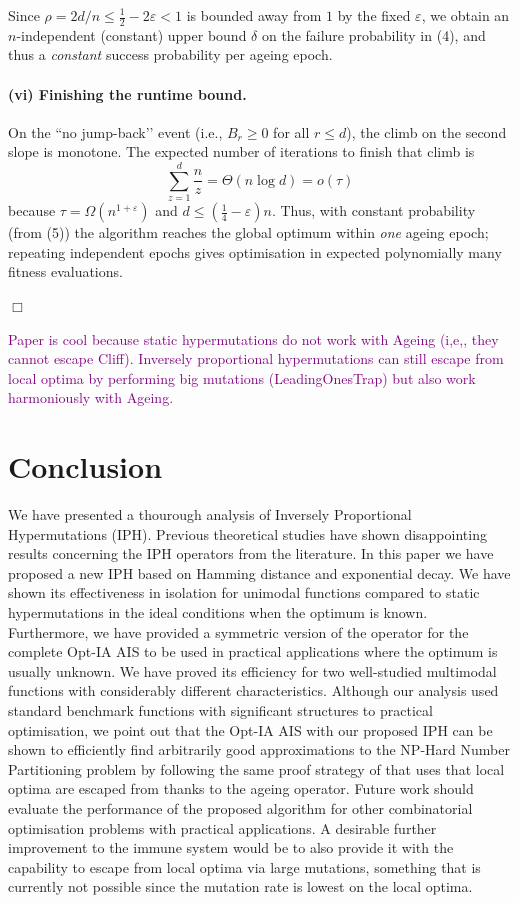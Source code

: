 \documentclass[lettersize,journal]{IEEEtran}
\begin{document}
Since \(\rho=2d/n\le \tfrac12-2\varepsilon<1\) is bounded away from \(1\) by the fixed \(\varepsilon\), we obtain an \(n\)-independent (constant) upper bound \(\delta\) on the failure probability in (4), and thus a \emph{constant} success probability per ageing epoch.

\paragraph{(vi) Finishing the runtime bound.}
On the “no jump-back’’ event (i.e., \(B_r\ge 0\) for all \(r\le d\)), the climb on the second slope is monotone. The expected number of iterations to finish that climb is
\[
\sum_{z=1}^{d}\frac{n}{z}=\Theta(n\log d)=o(\tau)
\]
because \(\tau=\Omega(n^{1+\varepsilon})\) and \(d\le (\tfrac14-\varepsilon)n\).
Thus, with constant probability (from (5)) the algorithm reaches the global optimum within \emph{one} ageing epoch; repeating independent epochs gives optimisation in expected polynomially many fitness evaluations.

\hfill\(\Box\)


\textcolor{purple}{Paper is cool because static hypermutations do not work with Ageing (i,e,, they cannot escape Cliff). Inversely proportional hypermutations can still escape from local optima by performing big mutations (LeadingOnesTrap) but also work harmoniously with Ageing.}

\section{Conclusion}
We have presented a thourough analysis of Inversely Proportional Hypermutations (IPH).
Previous theoretical studies have shown disappointing results concerning the IPH operators from the literature.
In this paper we have proposed a new IPH based on Hamming distance and exponential decay.
We have shown its effectiveness in isolation for unimodal functions compared to static hypermutations in the ideal conditions when the optimum is known.
Furthermore, we have provided a symmetric version of the operator for the complete Opt-IA AIS to be used in practical applications where the optimum is usually unknown.
We have proved its efficiency for two well-studied multimodal functions with considerably different characteristics.
Although our analysis used standard benchmark functions with significant structures to practical optimisation, we point out that the Opt-IA AIS with our proposed IPH can be shown to efficiently find arbitrarily good approximations to the NP-Hard Number Partitioning problem by following the same proof strategy of \cite{CorusOlivetoYazdaniAIJ2019} that uses that local optima are escaped from thanks to the ageing operator.
Future work should evaluate the performance of the proposed algorithm for other combinatorial optimisation problems with practical applications. A desirable further improvement to the immune system would be to also provide it with the capability to escape from local optima via large mutations, something that is currently not possible since the mutation rate is lowest on the local optima.
\end{document}
